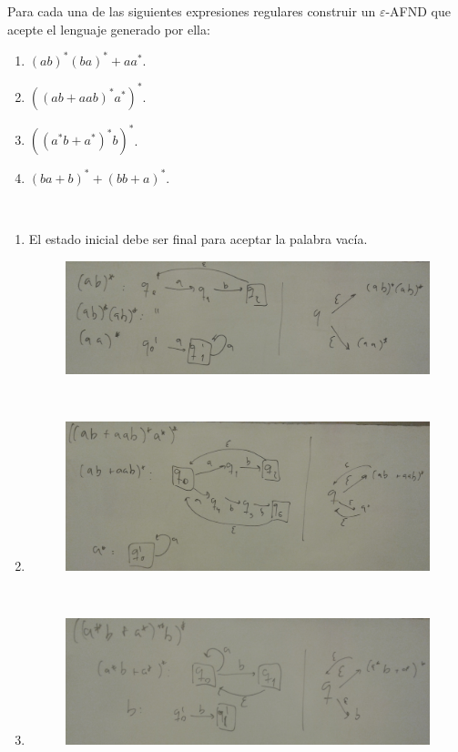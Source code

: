 \documentclass[twoside]{article}
\begin{document}
\begin{ejercicio}{6}
Para cada una de las siguientes expresiones regulares construir un $\varepsilon$-AFND que
acepte el lenguaje generado por ella:
\begin{enumerate}
\item $(ab)^*(ba)^*+aa^*$.
\item $((ab+aab)^*a^*)^*$.
\item $((a^*b+a^*)^*b)^*$.
\item $(ba + b)^* + (bb + a)^*$.
\end{enumerate}
\end{ejercicio}
\begin{solucion}\
\begin{enumerate}
\item El estado inicial debe ser final para aceptar la palabra vacía.

\begin{figure}[h!]
\includegraphics[scale=0.1]{Automatas/6-1}
\end{figure}\

\item 

\begin{figure}[h!]
\includegraphics[scale=0.1]{Automatas/6-2}
\end{figure}\
\item

\begin{figure}[h!]
\includegraphics[scale=0.1]{Automatas/6-3}
\end{figure}\


\end{enumerate}
\end{solucion}
\end{document}
